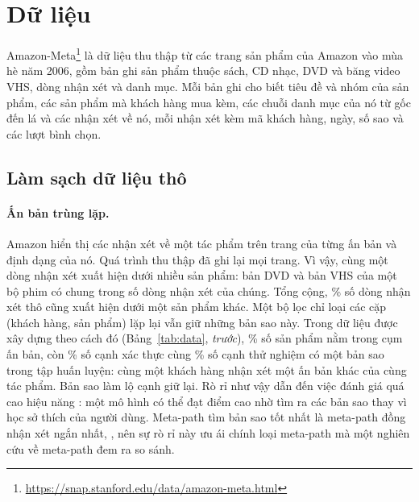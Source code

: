 \section{Dữ liệu}
\label{sec:data}

Amazon-Meta\footnote{\url{https://snap.stanford.edu/data/amazon-meta.html}}
\citep{leskovec2007viral} là dữ liệu thu thập từ các trang sản phẩm của Amazon vào mùa hè năm 2006,
gồm  bản ghi sản phẩm thuộc sách, CD nhạc, DVD và băng video VHS,
 dòng nhận xét và  danh mục. Mỗi bản ghi cho biết tiêu đề và
nhóm của sản phẩm, các sản phẩm mà khách hàng mua kèm, các chuỗi danh mục của nó từ gốc đến lá và
các nhận xét về nó, mỗi nhận xét kèm mã khách hàng, ngày, số sao và các lượt bình chọn.

\subsection{Làm sạch dữ liệu thô}

\paragraph{Ấn bản trùng lặp.} Amazon hiển thị các nhận xét về một tác phẩm trên trang của từng ấn
bản và định dạng của nó. Quá trình thu thập đã ghi lại mọi trang. Vì vậy, cùng một dòng nhận
xét xuất hiện dưới nhiều sản phẩm: bản DVD và bản VHS của một bộ phim có chung
 trong số  dòng nhận xét của chúng. Tổng cộng,
\% số dòng nhận xét thô cũng xuất hiện dưới một sản phẩm khác. Một bộ lọc chỉ
loại các cặp (khách hàng, sản phẩm) lặp lại vẫn giữ những bản sao này. Trong dữ liệu được xây dựng
theo cách đó (Bảng~\ref{tab:data}, \emph{trước}), \% số sản phẩm nằm
trong  cụm ấn bản, còn \% số cạnh xác thực cùng
\% số cạnh thử nghiệm có một bản sao trong tập huấn luyện: cùng một khách
hàng nhận xét một ấn bản khác của cùng tác phẩm. Bản sao làm lộ cạnh giữ lại. Rò rỉ như vậy dẫn
đến việc đánh giá quá cao hiệu năng \citep[\S3.3]{kaufman2012leakage}: một mô hình có thể đạt điểm
cao nhờ tìm ra các bản sao thay vì học sở thích của người dùng. Meta-path tìm bản sao tốt nhất là
meta-path đồng nhận xét ngắn nhất, , nên sự rò rỉ này ưu ái chính loại meta-path mà một
nghiên cứu về meta-path đem ra so sánh.

